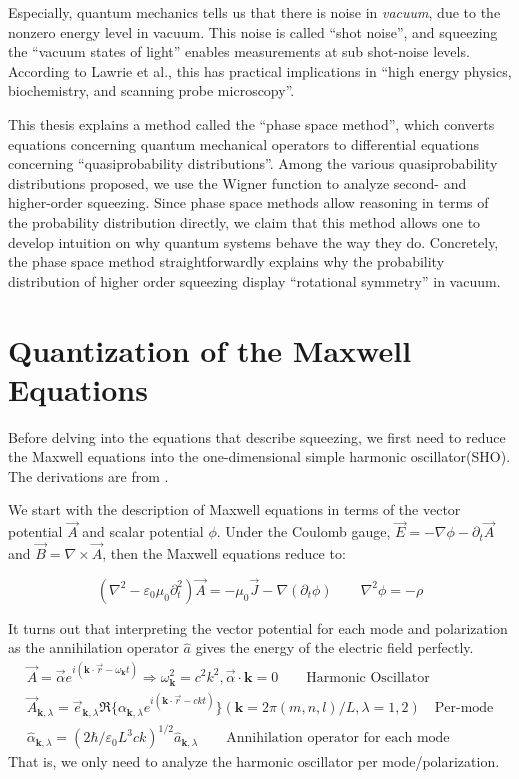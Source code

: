 \documentclass[10pt,a4paper]{report}
\begin{document}
Especially, quantum mechanics tells us that there is noise in \textit{vacuum}, due to the nonzero energy level in vacuum.
This noise is called ``shot noise'', and squeezing the ``vacuum states of light'' enables measurements at sub shot-noise levels.
According to Lawrie et al., this has practical implications in ``high energy physics, biochemistry, and scanning probe microscopy''\cite{qsensing}.

This thesis explains a method called the ``phase space method'', which converts equations concerning quantum mechanical operators to differential equations concerning ``quasiprobability distributions''.
Among the various quasiprobability distributions proposed, we use the Wigner function to analyze second- and higher-order squeezing.
Since phase space methods allow reasoning in terms of the probability distribution directly, we claim that this method allows one to develop intuition on why quantum systems behave the way they do.
Concretely, the phase space method straightforwardly explains why the probability distribution of higher order squeezing display ``rotational symmetry'' in vacuum.

\section{Quantization of the Maxwell Equations}
Before delving into the equations that describe squeezing, we first need to reduce the Maxwell equations into the one-dimensional simple harmonic oscillator(SHO).
The derivations are from \cite{loudon}.

We start with the description of Maxwell equations in terms of the vector potential $\vec{A}$ and scalar potential $\phi$.
Under the Coulomb gauge,
$\vec{E}=-\nabla\phi-\partial_{t}\vec{A}$ and $\vec{B}=\nabla\times\vec{A}$, then the Maxwell equations reduce to:

\begin{equation}
  (\nabla^{2}-\varepsilon_{0}\mu_{0}\partial_{t}^{2})\vec{A}=-\mu_{0}\vec{J}-\nabla(\partial_{t}\phi)\qquad
  \nabla^{2}\phi=-\rho
\end{equation}

It turns out that interpreting the vector potential for each mode and polarization as the annihilation operator $\hat{a}$ gives the energy of the electric field perfectly.
\begin{align}
  \vec{A}=\vec{\alpha}e^{i(\mathbf{k}\cdot\vec{r}-\omega_{\mathbf{k}}t)}\Rightarrow\omega_{\mathbf{k}}^{2}=c^{2}k^{2},\vec{\alpha}\cdot\mathbf{k}=0\qquad
  \text{Harmonic Oscillator}                                                                                                                                                             \\
  \vec{A}_{\mathbf{k},\lambda}=\vec{e}_{\mathbf{k},\lambda}\Re\{\alpha_{\mathbf{k},\lambda}e^{i(\mathbf{k}\cdot\vec{r}-ckt)}\}(\mathbf{k}=2\pi(m,n,l)/L,\lambda=1,2)\quad\text{Per-mode} \\
  \hat{\alpha}_{\mathbf{k},\lambda}=(2\hbar/\varepsilon_{0}L^{3}ck)^{1/2}\hat{a}_{\mathbf{k},\lambda}\qquad
  \text{Annihilation operator for each mode}
\end{align}
That is, we only need to analyze the harmonic oscillator per mode/polarization.
\end{document}
